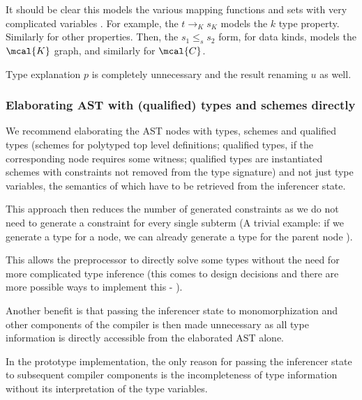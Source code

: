\begin{remark}
    It should be clear this models the various mapping functions and sets with very complicated variables . For example, the $t \to_K s_K$ models the $k$ type property. Similarly for other properties. Then, the $s_1 \leq_s s_2$ form, for data kinds, models the $\mcal{K}$ graph, and similarly for $\mcal{C}$.

    Type explanation $p$ is completely unnecessary and the result renaming $u$ as well.
\end{remark}

\subsubsection{Elaborating AST with (qualified) types and schemes directly}

We recommend elaborating the AST nodes with types, schemes and qualified types (schemes for polytyped top level definitions; qualified types, if the corresponding node requires some witness; qualified types are instantiated schemes with constraints not removed from the type signature) and not just type variables, the semantics of which have to be retrieved from the inferencer state.

This approach then reduces the number of generated constraints as we do not need to generate a constraint for every single subterm (A trivial example: if we generate a type  for a  node, we can already generate a type  for the parent node ).

This allows the preprocessor to directly solve some types without the need for more complicated type inference (this comes to design decisions and there are more possible ways to implement this - ).

Another benefit is that passing the inferencer state to monomorphization and other components of the compiler is then made unnecessary as all type information is directly accessible from the elaborated AST alone.

\begin{remark}
    In the prototype implementation, the only reason for passing the inferencer state to subsequent compiler components is the incompleteness of type information without its interpretation of the type variables. 
\end{remark}

